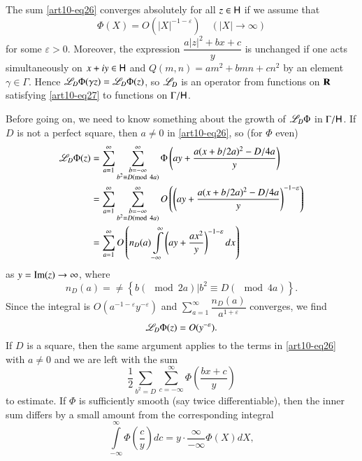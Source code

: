 The sum \eqref{art10-eq26} converges absolutely for all $z \in \mathsf{H}$ if we assume that 
\begin{equation*}
\Phi (X) = O(|X|^{-1-\varepsilon}) \quad (|X| \to \infty) \tag{27}\label{art10-eq27}
\end{equation*}
for some $\varepsilon > 0$. Moreover, the expression $\dfrac{a|z|^2 + bx +c}{y}$ is unchanged if one acts simultaneously on $x + iy \in \mathsf{H}$ and $Q(m,n) = am^2 + bmn + cn^2$ by an element $\gamma \in \Gamma$. Hence $\mathscr{L}_D \Phi (\gamma z) = \mathscr{L}_D \Phi (z)$, so $\mathscr{L}_D$ is an operator from functions on $\mathbf{R}$ satisfying \eqref{art10-eq27} to functions on $\Gamma / \mathsf{H}$.

Before going on, we need to know something about the growth of $\mathscr{L}_D\Phi$ in $\Gamma / \mathsf{H}$. If $D$ is not a perfect square, then $a \neq 0$ in \eqref{art10-eq26}, so (for $\Phi$ even)
\begin{align*}
\mathscr{L}_D \Phi (z)  & = \sum\limits^\infty_{a=1} \sum\limits^\infty_{\substack{b = -\infty\\ b^2 \equiv D ({\rm{mod}}\kern.3em 4a)}} \Phi \left(ay + \frac{a(x+ b/ 2 a)^2 - D / 4a}{y} \right)\\
& = \sum\limits^\infty_{a=1} \sum\limits^\infty_{\substack{b = - \infty\\ b^2 \equiv D ({\rm{mod}}\kern.3em 4a)}} O \left(\left(ay+ \frac{a(x + b / 2 a)^2 - D / 4a}{y} \right)^{-1-\varepsilon}\right)\\
& = \sum\limits^\infty_{a=1} O \left(n_D (a) \int\limits^\infty_{-\infty} \left(ay + \frac{ax^2}{y} \right)^{-1-\varepsilon} dx\right)
\end{align*}
as $y = \operatorname{Im} (z) \to \infty$, where 
\begin{equation*}
n_D (a) = \neq \left\{\left. b (\mod 2 a) \right| b^2 \equiv D (\mod 4 a) \right\}. \tag{28} \label{art10-eq28}
\end{equation*}
Since the integral is $O(a^{-1-\varepsilon} y^{-\varepsilon})$ and $\sum\limits^\infty_{a=1} \dfrac{n_D (a)}{a^{1+\varepsilon}}$ converges, we find 
$$
\mathscr{L}_D \Phi (z) = O (y^{-\varepsilon}).
$$\pageoriginale If $D$ is a square, then the same argument applies to the terms in \eqref{art10-eq26} with 
$a \neq 0$ and we are left with the sum 
$$
\frac{1}{2} \sum\limits_{b^2 =D} \sum\limits^\infty_{c = - \infty} \Phi (\frac{bx+c}{y})
$$
to estimate. If $\Phi$ is sufficiently smooth (say twice differentiable), then the inner sum differs by a small amount from the corresponding integral 
$$
\int\limits^\infty_{-\infty} \Phi (\frac{c}{y}) dc = y \cdot \frac{\infty}{-\infty} \Phi (X) d X,
$$
